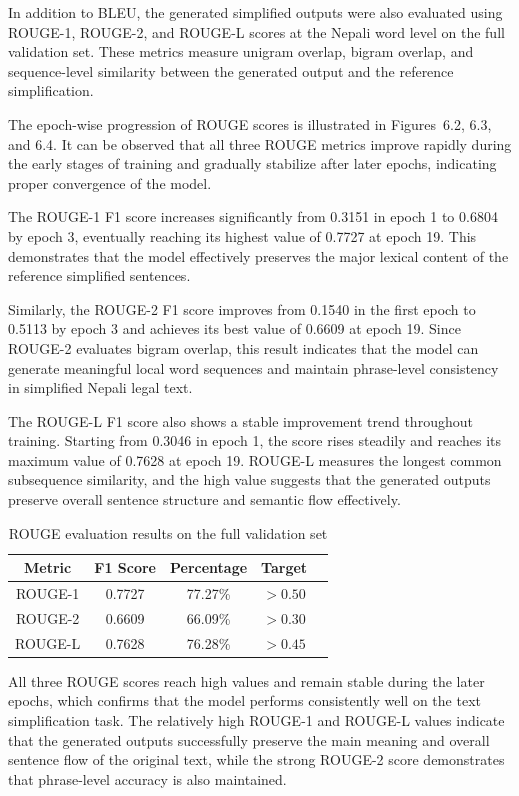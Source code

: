 \documentclass[12pt]{report}
\begin{document}
In addition to BLEU, the generated simplified outputs were also evaluated using ROUGE-1, ROUGE-2, and ROUGE-L scores at the Nepali word level on the full validation set. These metrics measure unigram overlap, bigram overlap, and sequence-level similarity between the generated output and the reference simplification.

The epoch-wise progression of ROUGE scores is illustrated in Figures~6.2, 6.3, and 6.4. It can be observed that all three ROUGE metrics improve rapidly during the early stages of training and gradually stabilize after later epochs, indicating proper convergence of the model.

The ROUGE-1 F1 score increases significantly from 0.3151 in epoch 1 to 0.6804 by epoch 3, eventually reaching its highest value of 0.7727 at epoch 19. This demonstrates that the model effectively preserves the major lexical content of the reference simplified sentences.

Similarly, the ROUGE-2 F1 score improves from 0.1540 in the first epoch to 0.5113 by epoch 3 and achieves its best value of 0.6609 at epoch 19. Since ROUGE-2 evaluates bigram overlap, this result indicates that the model can generate meaningful local word sequences and maintain phrase-level consistency in simplified Nepali legal text.

The ROUGE-L F1 score also shows a stable improvement trend throughout training. Starting from 0.3046 in epoch 1, the score rises steadily and reaches its maximum value of 0.7628 at epoch 19. ROUGE-L measures the longest common subsequence similarity, and the high value suggests that the generated outputs preserve overall sentence structure and semantic flow effectively.

\begin{table}[H]
\centering
\caption{ROUGE evaluation results on the full validation set}
\label{tab:rouge_results}
\small
\begin{tabular}{ccccc}
\toprule
\textbf{Metric} & \textbf{F1 Score} & \textbf{Percentage} & \textbf{Target} \\
\midrule
ROUGE-1 & 0.7727 & 77.27\% & $> 0.50$   \\
ROUGE-2 & 0.6609 & 66.09\% & $> 0.30$   \\
ROUGE-L & 0.7628 & 76.28\% & $> 0.45$ \\
\bottomrule
\end{tabular}
\end{table}

All three ROUGE scores reach high values and remain stable during the later epochs, which confirms that the model performs consistently well on the text simplification task. The relatively high ROUGE-1 and ROUGE-L values indicate that the generated outputs successfully preserve the main meaning and overall sentence flow of the original text, while the strong ROUGE-2 score demonstrates that phrase-level accuracy is also maintained.
\end{document}
